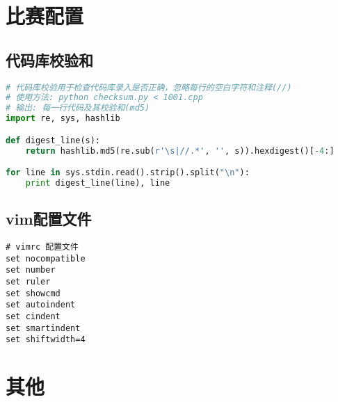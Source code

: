 \section{比赛配置}
\subsection{代码库校验和}
\begin{lstlisting}[language=Python]
# 代码库校验用于检查代码库录入是否正确，忽略每行的空白字符和注释(//)
# 使用方法: python checksum.py < 1001.cpp
# 输出: 每一行代码及其校验和(md5)
import re, sys, hashlib

def digest_line(s):
	return hashlib.md5(re.sub(r'\s|//.*', '', s)).hexdigest()[-4:]

for line in sys.stdin.read().strip().split("\n"):
	print digest_line(line), line
\end{lstlisting}
\subsection{vim配置文件}
\begin{lstlisting}[language={}]
# vimrc 配置文件
set nocompatible
set number
set ruler
set showcmd
set autoindent
set cindent
set smartindent
set shiftwidth=4
\end{lstlisting}

\section{其他}

